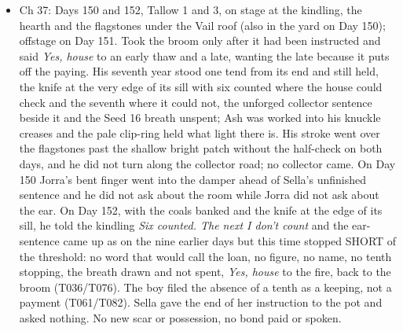 \documentclass{design/chronicle}
\begin{document}
{\begin{itemize}[leftmargin=1.4em,itemsep=1pt,topsep=3pt,parsep=0pt]
\item Ch 37: Days 150 and 152, Tallow 1 and 3, on stage at the kindling, the hearth and the flagstones under the Vail roof (also in the yard on Day 150); offstage on Day 151. Took the broom only after it had been instructed and said \emph{Yes, house} to an early thaw and a late, wanting the late because it puts off the paying. His seventh year stood one tend from its end and still held, the knife at the very edge of its sill with six counted where the house could check and the seventh where it could not, the unforged collector sentence beside it and the Seed 16 breath unspent; Ash was worked into his knuckle creases and the pale clip-ring held what light there is. His stroke went over the flagstones past the shallow bright patch without the half-check on both days, and he did not turn along the collector road; no collector came. On Day 150 Jorra’s bent finger went into the damper ahead of Sella’s unfinished sentence and he did not ask about the room while Jorra did not ask about the ear. On Day 152, with the coals banked and the knife at the edge of its sill, he told the kindling \emph{Six counted. The next I don’t count} and the ear-sentence came up as on the nine earlier days but this time stopped SHORT of the threshold: no word that would call the loan, no figure, no name, no tenth stopping, the breath drawn and not spent, \emph{Yes, house} to the fire, back to the broom (T036/T076). The boy filed the absence of a tenth as a keeping, not a payment (T061/T082). Sella gave the end of her instruction to the pot and asked nothing. No new scar or possession, no bond paid or spoken.

\end{itemize}

\begin{itemize}[leftmargin=1.4em,itemsep=1pt,topsep=3pt,parsep=0pt]


\end{itemize}}
\end{document}
